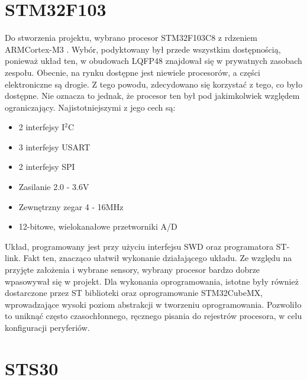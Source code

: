 \section{STM32F103}
Do stworzenia projektu, wybrano procesor STM32F103C8 z rdzeniem ARM\textregistered Cortex\textregistered-M3 \cite{stm_datasheet}. Wybór, podyktowany był przede wszystkim dostępnością, ponieważ układ ten, w obudowach LQFP48 znajdował się w prywatnych zasobach zespołu. Obecnie, na rynku dostępne jest niewiele procesorów, a części elektroniczne są drogie. Z tego powodu, zdecydowano się korzystać z tego, co było dostępne. Nie oznacza to jednak, że procesor ten był pod jakimkolwiek względem ograniczający. Najistotniejszymi z jego cech są:
\begin{itemize}
    \item 2 interfejsy I$^2$C
    \item 3 interfejsy USART
    \item 2 interfejsy SPI
    \item Zasilanie 2.0 - 3.6V
    \item Zewnętrzny zegar 4 - 16MHz
    \item 12-bitowe, wielokanałowe przetworniki A/D
\end{itemize}
Układ, programowany jest przy użyciu interfejsu SWD oraz programatora ST-link. Fakt ten, znacząco ułatwił wykonanie działającego układu. Ze względu na przyjęte założenia i wybrane sensory, wybrany procesor bardzo dobrze wpasowywał się w projekt. Dla wykonania oprogramowania, istotne były również dostarczone przez ST biblioteki oraz oprogramowanie STM32CubeMX, wprowadzające wysoki poziom abstrakcji w tworzeniu oprogramowania. Pozwoliło to uniknąć często czasochłonnego, ręcznego pisania do rejestrów procesora, w celu konfiguracji peryferiów.

\section{STS30}

